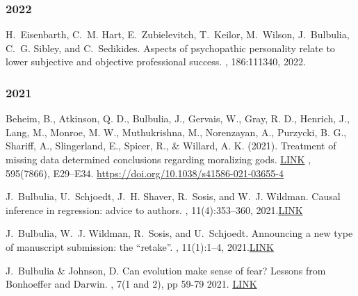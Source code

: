 \documentclass{article}
\begin{document}
\begin{thebibliography}{99}

\subsubsection*{2022}


H.~Eisenbarth, C.~M. Hart, E.~Zubielevitch, T.~Keilor, M.~Wilson, J.~Bulbulia,
  C.~G. Sibley, and C.~Sedikides.
\newblock Aspects of psychopathic personality relate to lower subjective and
  objective professional success.
, 186:111340, 2022.




\subsubsection*{2021}

Beheim, B., Atkinson, Q. D., Bulbulia, J., Gervais, W., Gray, R. D., Henrich, J., Lang, M., Monroe, M. W., Muthukrishna, M., Norenzayan, A., Purzycki, B. G., Shariff, A., Slingerland, E., Spicer, R., \& Willard, A. K. (2021). 
\newblock Treatment of missing data determined conclusions regarding moralizing gods. 
\newblock \href{https://www.dropbox.com/s/98zks9waw09kmgt/s41586-021-03655-4.pdf?dl=0}{LINK}
, 595(7866), E29–E34. \href{https://doi.org/10.1038/s41586-021-03655-4}{https://doi.org/10.1038/s41586-021-03655-4}


J.~Bulbulia, U.~Schjoedt, J.~H. Shaver, R.~Sosis, and W.~J. Wildman.
\newblock Causal inference in regression: advice to authors.
, 11(4):353--360, 2021.\href{https://www.tandfonline.com/doi/full/10.1080/2153599X.2021.2001259}{LINK}


J.~Bulbulia, W.~J. Wildman, R.~Sosis, and U.~Schjoedt.
\newblock Announcing a new type of manuscript submission: the ``retake''.
, 11(1):1--4, 2021.\href{https://www.tandfonline.com/doi/full/10.1080/2153599X.2021.1876333}{LINK}



J.~Bulbulia \& Johnson, D.
\newblock Can evolution make sense of fear? Lessons from Bonhoeffer and Darwin.
, 7(1 and 2), pp 59-79
  2021. \href{/Users/jbul176/The Virtues Project Dropbox/Joseph Bulbulia/00Bulbulia Pubs/2021/2021_DOM_BONHOFFER/Joseph-Bulbulia-and-Dominic-DP-Johnson-i8wdhc_5610_1629099188.pdf}{LINK}



\end{thebibliography}
\end{document}

